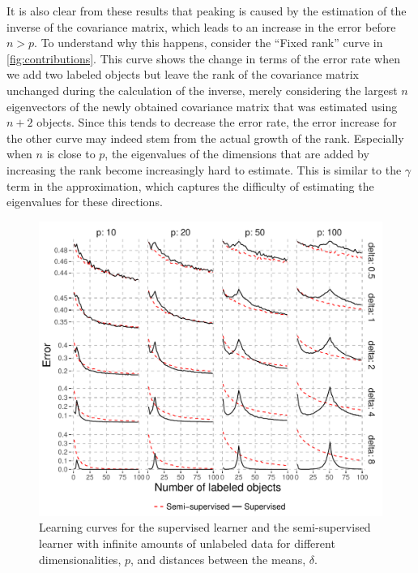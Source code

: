 \documentclass[runningheads,a4paper]{llncs}\usepackage[]{graphicx}\usepackage[]{color}
\makeatletter
\def\maxwidth{ %
  \ifdim\Gin@nat@width>\linewidth
    \linewidth
  \else
    \Gin@nat@width
  \fi
}
\newenvironment{knitrout}{}{} %
\makeatother
\begin{document}
It is also clear from these results that peaking is caused by the estimation of the inverse of the covariance matrix, which leads to an increase in the error before $n>p$. To understand why this happens, consider the ``Fixed rank'' curve in \cref{fig:contributions}. This curve shows the change in terms of the error rate when we add two labeled objects but leave the rank of the covariance matrix unchanged during the calculation of the inverse, merely considering the largest $n$ eigenvectors of the newly obtained covariance matrix that was estimated using $n+2$ objects. Since this tends to decrease the error rate, the error increase for the other curve may indeed stem from the actual growth of the rank. Especially when $n$ is close to $p$, the eigenvalues of the dimensions that are added by increasing the rank become increasingly hard to estimate. This is similar to the $\gamma$ term in the approximation, which captures the difficulty of estimating the eigenvalues for these directions.

\begin{knitrout}
\color{fgcolor}\begin{figure}
\includegraphics[width=\maxwidth]{figure/infinitedata-1} \caption[Learning curves for the supervised learner and the semi-supervised learner with infinite amounts of unlabeled data for different dimensionalities, $p$, and distances between the means, $\delta$]{Learning curves for the supervised learner and the semi-supervised learner with infinite amounts of unlabeled data for different dimensionalities, $p$, and distances between the means, $\delta$.}\label{fig:infinitedata}
\end{figure}


\end{knitrout}
\end{document}
